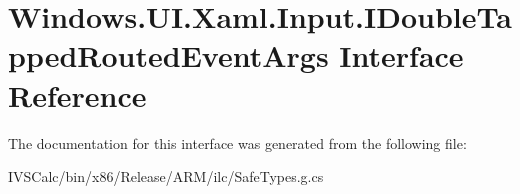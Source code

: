 \hypertarget{interface_windows_1_1_u_i_1_1_xaml_1_1_input_1_1_i_double_tapped_routed_event_args}{}\section{Windows.\+U\+I.\+Xaml.\+Input.\+I\+Double\+Tapped\+Routed\+Event\+Args Interface Reference}
\label{interface_windows_1_1_u_i_1_1_xaml_1_1_input_1_1_i_double_tapped_routed_event_args}


The documentation for this interface was generated from the following file\+:\begin{DoxyCompactItemize}
\item 
I\+V\+S\+Calc/bin/x86/\+Release/\+A\+R\+M/ilc/Safe\+Types.\+g.\+cs\end{DoxyCompactItemize}
